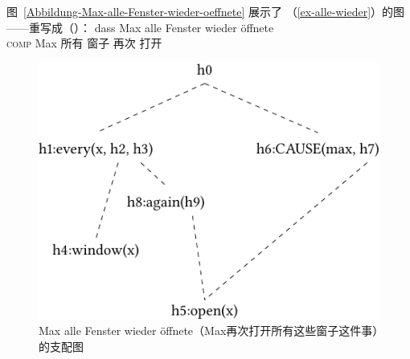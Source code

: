 图~\vref{Abbildung-Max-alle-Fenster-wieder-oeffnete} 展示了 （\ref{ex-alle-wieder}）的图——重写成（）：
\ea
\label{ex-alle-wieder-zwei}
\gll dass Max alle Fenster wieder öffnete\\
	 \textsc{comp} Max 所有 窗子 再次 打开\\
\z
\begin{figure}
\centering
\includegraphics{Figures/mrs-max-alle-fenster-wieder-oeffnete-cropped.pdf}
\caption{Max alle Fenster wieder öffnete（Max再次打开所有这些窗子这件事）的支配图\label{Abbildung-Max-alle-Fenster-wieder-oeffnete}}
\end{figure}%
